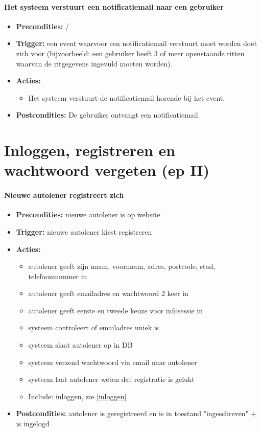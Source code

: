 \documentclass[]{article}
\begin{document}
\subsection{Het systeem verstuurt een notificatiemail naar een gebruiker}
\begin{itemize}
\item \textbf{Precondities:} /
\item \textbf{Trigger:} een event waarvoor een notificatiemail verstuurt moet worden doet zich voor (bijvoorbeeld: een gebruiker heeft 3 of meer openstaande ritten waarvan de ritgegevens ingevuld moeten worden).
\item \textbf{Acties:} 
\begin{itemize}
	\item	Het systeem verstuurt de notificatiemail horende bij het event.
\end{itemize}
\item \textbf{Postcondities:} De gebruiker ontvangt een notificatiemail.
\end{itemize}

\part{Inloggen, registreren en wachtwoord vergeten (ep II)}
\subsection{Nieuwe autolener registreert zich}
\begin{itemize}
\item \textbf{Precondities:} nieuwe autolener is op website
\item \textbf{Trigger:} nieuwe autolener kiest registreren
\item \textbf{Acties:} \begin{itemize}
\item	autolener geeft zijn naam, voornaam, adres, postcode, stad, telefoonnummer in
\item autolener geeft emailadres en wachtwoord 2 keer in
\item autolener geeft eerste en tweede keuze voor infosessie in
\item	systeem controleert of emailadres uniek is 
\item systeem slaat autolener op in DB
\item systeem verzend wachtwoord via email naar autolener
\item      systeem laat autolener weten dat registratie is gelukt
\item      Include: inloggen, zie \ref{inloggen}
\end{itemize}
\item \textbf{Postcondities:} autolener is geregistreerd en is in toestand "ingeschreven" + is ingelogd
\end{itemize}
\end{document}
